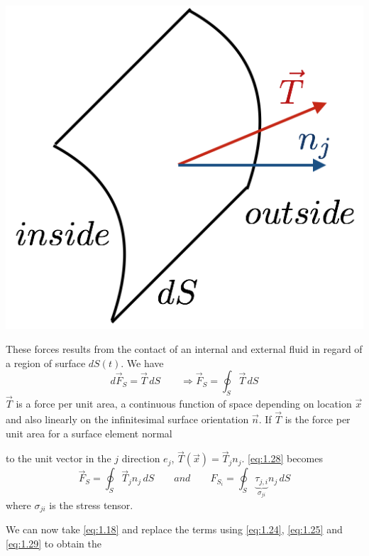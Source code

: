 \begin{itemize}
		\begin{minipage}{0.23\textwidth}
		\includegraphics[scale=0.3]{ch1/5}
		\label{fig:1.5}
		\end{minipage}
		\begin{minipage}{0.7\textwidth}
		These forces results from the contact of an internal and external fluid in regard of a region of surface $dS(t)$. We have 
		\begin{equation}
			d\vec{F}_S = \vec{T}\, dS \qquad \Rightarrow \vec{F}_S = \oint _S \vec{T}\, dS
			\label{eq:1.28}
		\end{equation}
		$\vec{T}$ is a force per unit area, a continuous function of space depending on location $\vec{x}$ and also linearly on the infinitesimal surface orientation $\vec{n}$. If $\vec{T}$ is the force per unit area for a surface element normal
		\end{minipage}
		 to the unit vector in the $j$ direction $e_j$, $\vec{T}(\vec{x}) = \vec{T}_jn_j$. \eqref{eq:1.28} becomes
		 \begin{equation}
		 \vec{F}_S = \oint _S \vec{T}_j n_j \, dS \qquad and \qquad F_{S_i} = \oint _S \underbrace{\tau _{j,i}}_{\sigma _{ji}} n_j\, dS 
		 \label{eq:1.29}
		 \end{equation}
		 where $\sigma _{ji}$ is the stress tensor. 
		\end{itemize}
		We can now take \eqref{eq:1.18} and replace the terms using \eqref{eq:1.24}, \eqref{eq:1.25} and \eqref{eq:1.29} to obtain the 
		
